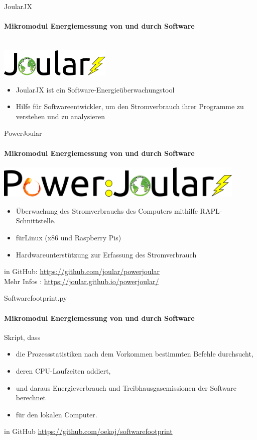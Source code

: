\begin{frame}{JoularJX}
\framesubtitle{Mikromodul Energiemessung von und durch Software}
~\\\hspace*{\fill}
\includegraphics[width=0.40\textwidth]{../Figures/joular.png}

\begin{itemize}
	\item JoularJX ist ein Software-Energieüberwachungstool
  \item Hilfe für  Softwareentwickler, um den Stromverbrauch 
ihrer Programme zu verstehen und zu analysieren

\end{itemize}
\end{frame}

\begin{frame}{PowerJoular}
\framesubtitle{Mikromodul Energiemessung von und durch Software}
\includegraphics[width=0.90\textwidth]{../Figures/powerjoular.png}

\begin{itemize}
	\item Überwachung des Stromverbrauchs des Computers mithilfe RAPL-Schnittstelle.
	\item fürLinux (x86 und Raspberry Pis)
	\item Hardwareunterstützung zur Erfassung des Stromverbrauch 
\end{itemize}
in GitHub: \href{https://github.com/joular/powerjoular}{https://github.com/joular/powerjoular}\\
Mehr Infos : \href{https://joular.github.io/powerjoular/}{https://joular.github.io/powerjoular/}

\hspace*{\fill} \cite{noureddine-ie-2022}
\end{frame}

\begin{frame}{Softwarefootprint.py}
\framesubtitle{Mikromodul Energiemessung von und durch Software}
Skript, dass
\begin{itemize}
	\item   die Prozessstatistiken nach dem Vorkommen  bestimmten Befehle durchsucht,
	\item  deren CPU-Laufzeiten addiert,
	\item  und daraus Energieverbrauch und Treibhausgasemissionen der Software berechnet
	\item für den lokalen Computer.
\end{itemize}

in GitHub \href{https://github.com/oekoj/softwarefootprint}{https://github.com/oekoj/softwarefootprint}
\end{frame}


